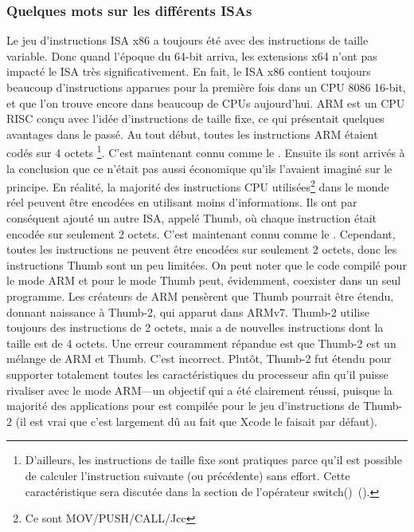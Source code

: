 %
%
%

\subsubsection{Quelques mots sur les différents \ac{ISA}s}
Le jeu d'instructions \ac{ISA} x86 a toujours été avec des instructions de taille
variable. Donc quand l'époque du 64-bit arriva, les extensions x64 n'ont pas impacté
le \ac{ISA} très significativement. En fait, le \ac{ISA} x86 contient toujours beaucoup
d'instructions apparues pour la première fois dans un CPU 8086 16-bit, et que l'on
trouve encore dans beaucoup de CPUs aujourd'hui.
ARM est un \ac{CPU} \ac{RISC} conçu avec l'idée d'instructions de taille fixe, ce qui présentait quelques avantages dans le passé.
Au tout début, toutes les instructions ARM étaient codés sur 4 octets%
\footnote{D'ailleurs, les instructions de taille fixe sont pratiques parce qu'il est possible de calculer l'instruction suivante (ou précédente) sans effort. Cette caractéristique sera discutée dans la section de l'opérateur switch()~().}.
C'est maintenant connu comme le .
Ensuite ils sont arrivés à la conclusion que ce n'était pas aussi économique qu'ils l'avaient imaginé sur le principe.
En réalité, la majorité des instructions \ac{CPU} utilisées\footnote{Ce sont MOV/PUSH/CALL/Jcc} dans le monde réel peuvent être encodées en utilisant moins d'informations.
Ils ont par conséquent ajouté un autre \ac{ISA}, appelé Thumb, où chaque instruction était encodée sur seulement 2 octets.
C'est maintenant connu comme le .
Cependant, toutes les instructions ne peuvent être encodées sur seulement 2 octets, donc les instructions Thumb sont un peu limitées.
On peut noter que le code compilé pour le mode ARM et pour le mode Thumb peut, évidemment, coexister dans un seul programme.
Les créateurs de ARM pensèrent que Thumb pourrait être étendu, donnant naissance à Thumb-2, qui apparut dans ARMv7.
Thumb-2 utilise toujours des instructions de 2 octets, mais a de nouvelles instructions dont la taille est de 4 octets.
Une erreur couramment répandue est que Thumb-2 est un mélange de ARM et Thumb. C'est incorrect.
Plutôt, Thumb-2 fut étendu pour supporter totalement toutes les caractéristiques du processeur afin qu'il puisse
rivaliser avec le mode ARM---un objectif qui a été clairement réussi, puisque la majorité des applications pour \idevices est compilée pour le jeu d'instructions de Thumb-2 (il est vrai que c'est largement dû au fait que Xcode le faisait par défaut).
